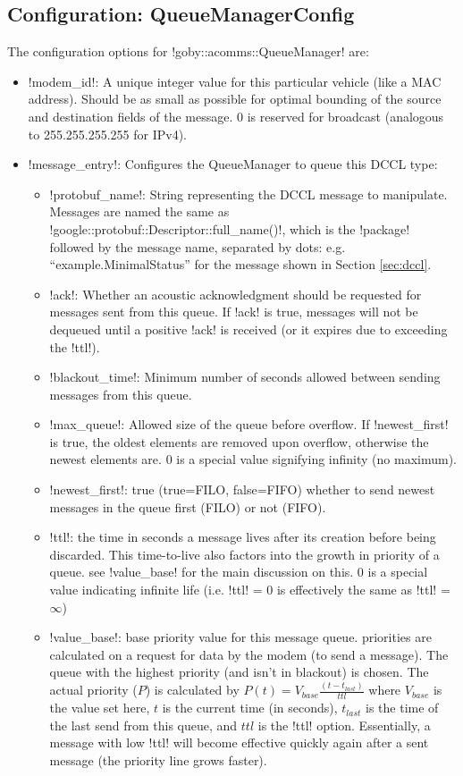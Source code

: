 \subsection{Configuration: QueueManagerConfig}

The configuration options for !goby::acomms::QueueManager! are:

\resetbvlinenumber

\begin{itemize}
\item !modem_id!: A unique integer value for this particular vehicle (like a MAC address). Should be as small as possible for optimal bounding of the source and destination fields of the message. 0 is reserved for broadcast (analogous to 255.255.255.255 for IPv4).
\item !message_entry!: Configures the QueueManager to queue this DCCL type:
\begin{itemize}
\item !protobuf_name!: String representing the DCCL message to manipulate. Messages are named the same as !google::protobuf::Descriptor::full_name()!, which is the !package! followed by the message name, separated by dots: e.g. ``example.MinimalStatus'' for the message shown in Section \ref{sec:dccl}.
\item !ack!: Whether an acoustic acknowledgment should be requested for messages sent from this queue. If !ack! is true, messages will not be dequeued until a positive !ack! is received (or it expires due to exceeding the !ttl!).
\item !blackout_time!: Minimum number of seconds allowed between sending messages from this queue.
\item !max_queue!: Allowed size of the queue before overflow. If !newest_first! is true, the oldest elements are removed upon overflow, otherwise the newest elements are. 0 is a special value signifying infinity (no maximum).
\item !newest_first!: true	(true=FILO, false=FIFO) whether to send newest messages in the queue first (FILO) or not (FIFO).
\item !ttl!: the time in seconds a message lives after its creation before being discarded. This time-to-live also factors into the growth in priority of a queue. see !value_base! for the main discussion on this. 0 is a special value indicating infinite life (i.e. !ttl! = 0 is effectively the same as !ttl! = $\infty$)
\item !value_base!: base priority value for this message queue. priorities are calculated on a request for data by the modem (to send a message). The queue with the highest priority (and isn't in blackout) is chosen. The actual priority ($P$) is calculated by $P(t) = V_{base} \frac{(t-t_{last})}{ttl}$ where $V_{base}$ is the value set here, $t$ is the current time (in seconds), $t_{last}$ is the time of the last send from this queue, and $ttl$ is the !ttl! option. Essentially, a message with low !ttl! will become effective quickly again after a sent message (the priority line grows faster).

\end{itemize}
\end{itemize}
